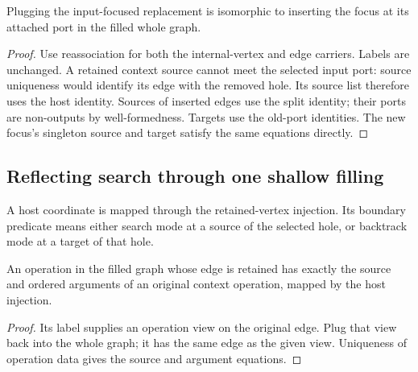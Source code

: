 \begin{theorem}
Plugging the input-focused replacement is isomorphic to inserting the focus
at its attached port in the filled whole graph.
\end{theorem}
\begin{proof}
Use reassociation for both the internal-vertex and edge carriers. Labels are
unchanged. A retained context source cannot meet the selected input port:
source uniqueness would identify its edge with the removed hole. Its source
list therefore uses the host identity. Sources of inserted edges use the
split identity; their ports are non-outputs by well-formedness. Targets use
the old-port identities. The new focus's singleton source and target satisfy
the same equations directly.
\end{proof}


\clearpage
\subsection{Reflecting search through one shallow filling}

\begin{definition}
A host coordinate is mapped through the retained-vertex injection. Its boundary
predicate means either search mode at a source of the selected hole, or
backtrack mode at a target of that hole.
\end{definition}
\begin{lemma}
An operation in the filled graph whose edge is retained has exactly the source
and ordered arguments of an original context operation, mapped by the host
injection.
\end{lemma}
\begin{proof}
Its label supplies an operation view on the original edge. Plug that view back
into the whole graph; it has the same edge as the given view. Uniqueness of
operation data gives the source and argument equations.
\end{proof}


